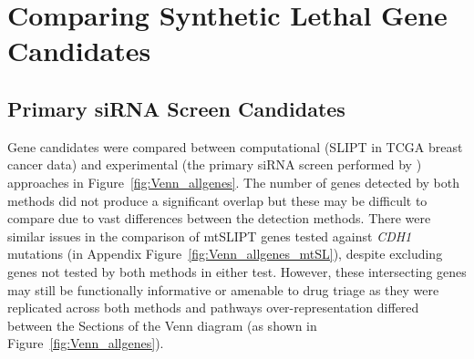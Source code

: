 

\FloatBarrier

\section{Comparing Synthetic Lethal Gene Candidates} \label{chapt3:compare_SL_genes}  



\subsection{Primary siRNA Screen Candidates} \label{chapt3:primary_screen}

Gene candidates were compared between computational (\gls{SLIPT} in \gls{TCGA} breast cancer data) and experimental (the primary \gls{siRNA} screen performed by \citet{Telford2015}) approaches in Figure~\ref{fig:Venn_allgenes}. The number of genes detected by both methods did not produce a significant overlap but these may be difficult to compare due to vast differences between the detection methods. There were similar issues in the comparison of \acrshort{mtSLIPT} genes tested against \textit{CDH1} \glspl{mutation} (in Appendix Figure~\ref{fig:Venn_allgenes_mtSL}), despite excluding genes not tested by both methods in either test. However, these intersecting genes may still be functionally informative or amenable to drug triage as they were replicated across both methods and \glspl{pathway} over-represent\-ation differed between the Sections of the Venn diagram (as shown in Figure~\ref{fig:Venn_allgenes}).

